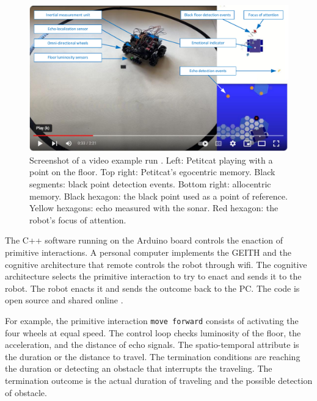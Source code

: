 \documentclass[runningheads]{llncs}
\begin{document}
\begin{figure}
	\includegraphics[width=\textwidth]{Figure_video.pdf}
	\caption{Screenshot of a video example run \cite{georgeon_petitcat_2024}.
		Left: Petitcat playing with a point on the floor.
		Top right: Petitcat's egocentric memory. Black segments: black point detection events. 
		Bottom right: allocentric memory. Black hexagon: the black point used as a point of reference. Yellow hexagons: echo measured with the sonar. Red hexagon: the robot's focus of attention.} \label{fig:video}
\end{figure}

The C++ software running on the Arduino board controls the enaction of primitive interactions. 
A personal computer implements the GEITH and the cognitive architecture that remote controls the robot through wifi.
The cognitive architecture selects the primitive interaction to try to enact and sends it to the robot. 
The robot enacts it and sends the outcome back to the PC.  
The code is open source and shared online \cite{petitcat_github}.

For example, the primitive interaction \texttt{move forward} consists of activating the four wheels at equal speed. 
The control loop checks luminosity of the floor, the acceleration, and the distance of echo signals. 
The spatio-temporal attribute is the duration or the distance to travel. 
The termination conditions are reaching the duration or detecting an obstacle that interrupts the traveling.  
The termination outcome is the actual duration of traveling and the possible detection of obstacle. 
\end{document}
